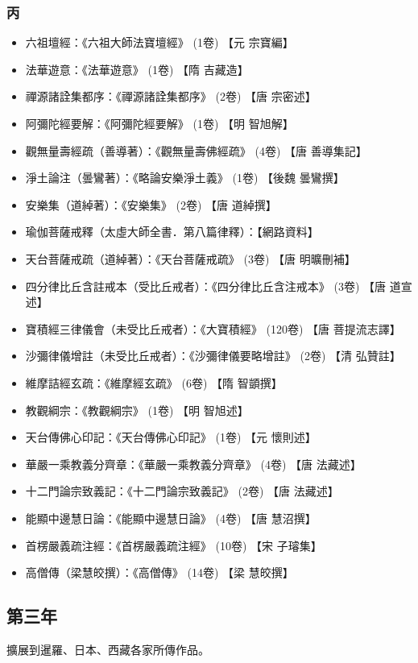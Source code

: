 \subsubsection{丙}
\begin{itemize}
  \item 六祖壇經：《六祖大師法寶壇經》 (1卷) 【元 宗寶編】
  \item 法華遊意：《法華遊意》 (1卷) 【隋 吉藏造】
  \item 禪源諸詮集都序：《禪源諸詮集都序》 (2卷) 【唐 宗密述】
  \item 阿彌陀經要解：《阿彌陀經要解》 (1卷) 【明 智旭解】
  \item 觀無量壽經疏（善導著）：《觀無量壽佛經疏》 (4卷) 【唐 善導集記】
  \item 淨土論注（曇鸞著）：《略論安樂淨土義》 (1卷) 【後魏 曇鸞撰】
  \item 安樂集（道綽著）：《安樂集》 (2卷) 【唐 道綽撰】
  \item 瑜伽菩薩戒釋（太虛大師全書．第八篇律釋）：【網路資料】
  \item 天台菩薩戒疏（道綽著）：《天台菩薩戒疏》 (3卷) 【唐 明曠刪補】
  \item 四分律比丘含註戒本（受比丘戒者）：《四分律比丘含注戒本》 (3卷) 【唐 道宣述】
  \item 寶積經三律儀會（未受比丘戒者）：《大寶積經》 (120卷) 【唐 菩提流志譯】
  \item 沙彌律儀增註（未受比丘戒者）：《沙彌律儀要略增註》 (2卷) 【清 弘贊註】
  \item 維摩詰經玄疏：《維摩經玄疏》 (6卷) 【隋 智顗撰】
  \item 教觀綱宗：《教觀綱宗》 (1卷) 【明 智旭述】
  \item 天台傳佛心印記：《天台傳佛心印記》 (1卷) 【元 懷則述】
  \item 華嚴一乘教義分齊章：《華嚴一乘教義分齊章》 (4卷) 【唐 法藏述】
  \item 十二門論宗致義記：《十二門論宗致義記》 (2卷) 【唐 法藏述】
  \item 能顯中邊慧日論：《能顯中邊慧日論》 (4卷) 【唐 慧沼撰】
  \item 首楞嚴義疏注經：《首楞嚴義疏注經》 (10卷) 【宋 子璿集】
  \item 高僧傳（梁慧皎撰）：《高僧傳》 (14卷) 【梁 慧皎撰】
\end{itemize}
\subsection{第三年}
擴展到暹羅、日本、西藏各家所傳作品。
